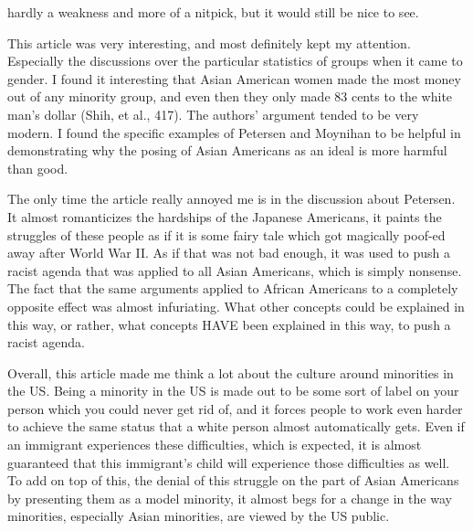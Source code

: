 \documentclass[12pt]{article}
\begin{document}
hardly a weakness and more of a nitpick, but it would still be nice to
see.
\par
This article was very interesting, and most definitely kept my
attention. Especially the discussions over the particular statistics
of groups when it came to gender. I found it interesting that Asian
American women made the most money out of any minority group, and even
then they only made 83 cents to the white man's dollar (Shih, et al.,
417). The authors' argument tended to be very modern. I found the
specific examples of Petersen and Moynihan to be helpful in
demonstrating why the posing of Asian Americans as an ideal is more
harmful than good.
\par
The only time the article really annoyed me is in the discussion about
Petersen. It almost romanticizes the hardships of the Japanese
Americans, it paints the struggles of these people as if it is some
fairy tale which got magically poof-ed away after World War II. As if
that was not bad enough, it was used to push a racist agenda that was
applied to all Asian Americans, which is simply nonsense. The fact
that the same arguments applied to African Americans to a completely
opposite effect was almost infuriating. What other concepts could be
explained in this way, or rather, what concepts HAVE been explained in
this way, to push a racist agenda.
\par
Overall, this article made me think a lot about the culture around
minorities in the US. Being a minority in the US is made out to be
some sort of label on your person which you could never get rid of,
and it forces people to work even harder to achieve the same status
that a white person almost automatically gets. Even if an immigrant
experiences these difficulties, which is expected, it is almost
guaranteed that this immigrant's child will experience those
difficulties as well. To add on top of this, the denial of this
struggle on the part of Asian Americans by presenting them as a model
minority, it almost begs for a change in the way minorities,
especially Asian minorities, are viewed by the US public. 

\end{document}
